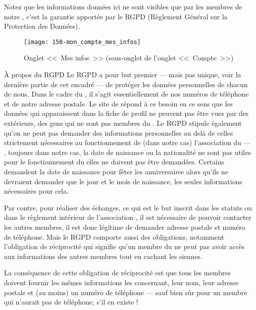 Notez que les informations données ici ne sont visibles que par les membres de notre \sel, c’est la garantie apportée par le RGPD (Règlement Général sur la Protection des Données).
\begin{figure}
    \texttt{[image: 150-mon\_compte\_mes\_infos]}
    \caption[Onglet <<~Mes infos~>>]{Onglet <<~Mes infos~>> (sous-onglet de l'onglet <<~Compte~>>)}
    \label{fig:mesInfos}
\end{figure}
\begin{mybox}[colbacktitle=MidnightBlue]{À propos du RGPD}
    Le RGPD a pour but premier --- mais pas unique, voir la dernière partie de cet encadré --- de protéger les données personnelles de chacun de nous. Dans le cadre du \sel{}, il s'agit essentiellement de nos numéros de téléphone et de notre adresse postale. Le site de \CF{} répond à ce besoin en ce sens que les données qui apparaissent dans la fiche de profil ne peuvent pas être vues par des extérieurs, \cad{} des gens qui ne sont pas membres du \CdS.
    \aster
    Le RGPD stipule également qu'on ne peut pas demander des informations personnelles au delà de celles strictement nécessaires au fonctionnement de (dans notre cas) l'association du \sel{} --- \ex, toujours dans notre cas, la date de naissance ou la nationalité ne sont pas utiles pour le fonctionnement du \sel{} elles ne doivent pas être demandées. Certains \sel{} demandent la date de naissance pour fêter les anniversaires alors  qu'ils ne devraient demander que le jour et le mois de naissance, les seules informations nécessaires pour cela.
    
    Par contre, pour réaliser des échanges, ce qui est le but inscrit dans les statuts ou dans le règlement intérieur de l'association \CdS, il est nécessaire de pouvoir contacter les autres membres, il est donc légitime de demander adresse postale et numéro de téléphone.
    \aster
    Mais le RGPD comporte aussi des obligations, notamment l'obligation de réciprocité qui signifie qu'un membre du \sel{} ne peut pas avoir accès aux informations des autres membres tout en cachant les siennes. 
    
    La conséquence de cette obligation de réciprocité est que tous les membres doivent fournir les mêmes informations les concernant, \cad{} leur nom, leur adresse postale et (au moins) un numéro de téléphone --- sauf bien sûr pour un membre qui n'aurait pas de téléphone, s'il en existe !
\end{mybox}

